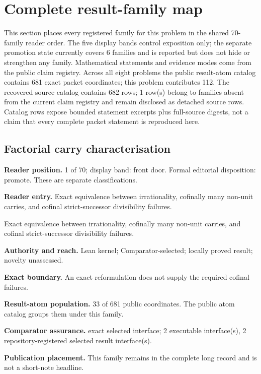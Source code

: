 \documentclass[11pt]{article}
\begin{document}
\clearpage
\section{Complete result-family map}\label{sec:erdos-68-complete-family-map}

This section places every registered family for this problem in the shared 70-family reader order.  The five display bands control exposition only; the separate promotion state currently covers 6 families and is reported but does not hide or strengthen any family.  Mathematical statements and evidence modes come from the public claim registry.  Across all eight problems the public result-atom catalog contains 681 exact packet coordinates; this problem contributes 112.  The recovered source catalog contains 682 rows; 1 row(s) belong to families absent from the current claim registry and remain disclosed as detached source rows.  Catalog rows expose bounded statement excerpts plus full-source digests, not a claim that every complete packet statement is reproduced here.

\subsection{Factorial carry characterisation}
\textbf{Reader position.} 1 of 70; display band: front door.  Formal editorial disposition: promote.  These are separate classifications.

\textbf{Reader entry.} Exact equivalence between irrationality, cofinally many non-unit carries, and cofinal strict-successor divisibility failures.

Exact equivalence between irrationality, cofinally many non-unit carries, and cofinal strict-successor divisibility failures.

\textbf{Authority and reach.} Lean kernel; Comparator-selected; locally proved result; novelty unassessed.

\textbf{Exact boundary.} An exact reformulation does not supply the required cofinal failures.

\textbf{Result-atom population.} 33 of 681 public coordinates. The public atom catalog groups them under this family.

\textbf{Comparator assurance.} exact selected interface; 2 executable interface(s), 2 repository-registered selected result interface(s).

\textbf{Publication placement.} This family remains in the complete long record and is not a short-note headline.
\end{document}
